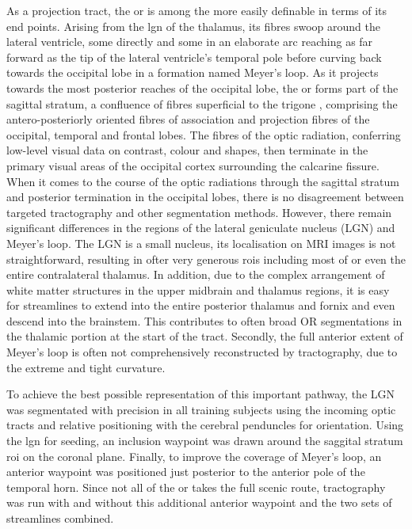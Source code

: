 As a projection tract, the \gls{or} is among the more easily definable in terms of its end points.
Arising from the \gls{lgn} of the thalamus, its fibres swoop around the lateral ventricle, some directly and some in an elaborate arc reaching as far forward as the tip of the lateral ventricle's temporal pole before curving back towards the occipital lobe in a formation named Meyer's loop.\autocite{Sarubbo2015}
As it projects towards the most posterior reaches of the occipital lobe, the \gls{or} forms part of the sagittal stratum, a confluence of fibres superficial to the trigone , comprising the antero-posteriorly oriented fibres of association and projection fibres of the occipital, temporal and frontal lobes.\autocite{Maldonado2021}
The fibres of the optic radiation, conferring low-level visual data on contrast, colour and shapes, then terminate in the primary visual areas of the occipital cortex surrounding the calcarine fissure.
When it comes to the course of the optic radiations through the sagittal stratum and posterior termination in the occipital lobes, there is no disagreement between targeted tractography and other segmentation methods.
However, there remain significant differences in the regions of the lateral geniculate nucleus (LGN) and Meyer's loop.
The LGN is a small nucleus, its localisation on MRI images is not straightforward, resulting in ofter very generous \glspl{roi} including most of or even the entire contralateral thalamus.
In addition, due to the complex arrangement of white matter structures in the upper midbrain and thalamus regions, it is easy for streamlines to extend into the entire posterior thalamus and fornix and even descend into the brainstem.
This contributes to often broad OR segmentations in the thalamic portion at the start of the tract.
Secondly, the full anterior extent of Meyer's loop is often not comprehensively reconstructed by tractography, due to the extreme and tight curvature.\autocite{Lilja2015,Chamberland2018}

To achieve the best possible representation of this important pathway, the LGN was segmentated with precision in all training subjects using the incoming optic tracts and relative positioning with the cerebral penduncles for orientation.
Using the \gls{lgn} for seeding, an inclusion waypoint was drawn around the saggital stratum \gls{roi} on the coronal plane.
Finally, to improve the coverage of Meyer's loop, an anterior waypoint was positioned just posterior to the anterior pole of the temporal horn.
Since not all of the \gls{or} takes the full scenic route, tractography was run with and without this additional anterior waypoint and the two sets of streamlines combined.

